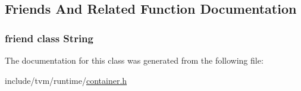 \subsection{Friends And Related Function Documentation}
\subsubsection[{\texorpdfstring{String}{String}}]{\setlength{\rightskip}{0pt plus 5cm}friend class {\bf String}\hspace{0.3cm}{\ttfamily [friend]}}\hypertarget{classtvm_1_1runtime_1_1StringObj_1_1FromStd_a7fb804f7dc96dd9f705c84095f37f1ca}{}\label{classtvm_1_1runtime_1_1StringObj_1_1FromStd_a7fb804f7dc96dd9f705c84095f37f1ca}


The documentation for this class was generated from the following file\+:\begin{DoxyCompactItemize}
\item 
include/tvm/runtime/\hyperlink{runtime_2container_8h}{container.\+h}\end{DoxyCompactItemize}
